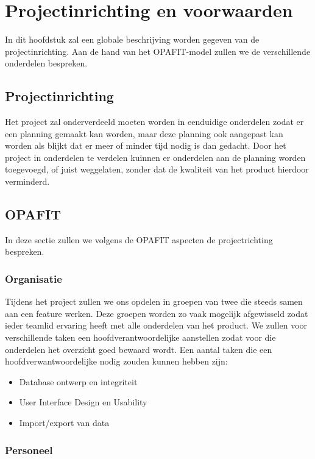 \section{Projectinrichting en voorwaarden}
\label{projectinrichting}

In dit hoofdstuk zal een globale beschrijving worden gegeven van de projectinrichting. Aan de hand van het OPAFIT-model zullen we de verschillende onderdelen bespreken. 

\subsection{Projectinrichting}

Het project zal onderverdeeld moeten worden in eenduidige onderdelen zodat er een planning gemaakt kan worden,
maar deze planning ook aangepast kan worden als blijkt dat er meer of minder tijd nodig is dan gedacht.
Door het project in onderdelen te verdelen kuinnen er onderdelen aan de planning worden toegevoegd,
of juist weggelaten, zonder dat de kwaliteit van het product hierdoor verminderd.

\subsection{OPAFIT}

In deze sectie zullen we volgens de OPAFIT aspecten de projectrichting bespreken.

\subsubsection{Organisatie}

Tijdens het project zullen we ons opdelen in groepen van twee die steeds samen aan een feature werken.
Deze groepen worden zo vaak mogelijk afgewisseld zodat ieder teamlid ervaring heeft met alle onderdelen van het product.
We zullen voor verschillende taken een hoofdverantwoordelijke aanstellen zodat voor die onderdelen het overzicht goed bewaard wordt.
Een aantal taken die een hoofdverwantwoordelijke nodig zouden kunnen hebben zijn:
\begin{itemize}
    \item Database ontwerp en integriteit
    \item User Interface Design en Usability
    \item Import/export van data
\end{itemize}

\subsubsection{Personeel}

